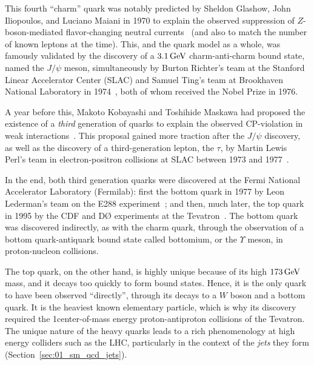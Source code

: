 This fourth ``charm'' quark was notably predicted by Sheldon Glashow, John Iliopoulos, and Luciano Maiani in 1970 to explain the observed suppression of $Z$-boson-mediated flavor-changing neutral currents~\cite{Glashow:1970gm} (and also to match the number of known leptons at the time).
This, and the quark model as a whole, was famously validated by the discovery of a $3.1 \,\text{Ge\hspace{-.08em}V}$ charm-anti-charm bound state, named the $J/\psi$ meson, simultaneously by Burton Richter's team at the Stanford Linear Accelerator Center (SLAC) and Samuel Ting's team at Brookhaven National Laboratory in 1974~\cite{SLAC-SP-017:1974ind, E598:1974sol}, both of whom received the Nobel Prize in 1976.

A year before this, Makoto Kobayashi and Toshihide Maskawa had proposed the existence of a \textit{third} generation of quarks to explain the observed CP-violation in weak interactions~\cite{Kobayashi:1973fv}.
This proposal gained more traction after the $J/\psi$ discovery, as well as the discovery of a third-generation lepton, the $\tau$, by Martin Lewis Perl's team in electron-positron collisions at SLAC between 1973 and 1977~\cite{Perl:1975bf}.

In the end, both third generation quarks were discovered at the Fermi National Accelerator Laboratory (Fermilab): first the bottom quark in 1977 by Leon Lederman's team on the E288 experiment~\cite{E288:1977xhf}; and then, much later, the top quark in 1995 by the CDF and DØ experiments at the Tevatron~\cite{CDF:1995wbb, D0:1995jca}.
The bottom quark was discovered indirectly, as with the charm quark, through the observation of a bottom quark-antiquark bound state called bottomium, or the $\Upsilon$ meson, in proton-nucleon collisions.

The top quark, on the other hand, is highly unique because of its high $173 \,\text{Ge\hspace{-.08em}V}$ mass, and it decays too quickly to form bound states.
Hence, it is the only quark to have been observed ``directly'', through its decays to a $W$ boson and a bottom quark.
It is the heaviest known elementary particle, which is why its discovery required the 1\TeV center-of-mass energy proton-antiproton collisions of the Tevatron.
The unique nature of the heavy quarks leads to a rich phenomenology at high energy colliders such as the LHC, particularly in the context of the \textit{jets} they form (Section~\ref{sec:01_sm_qcd_jets}).


